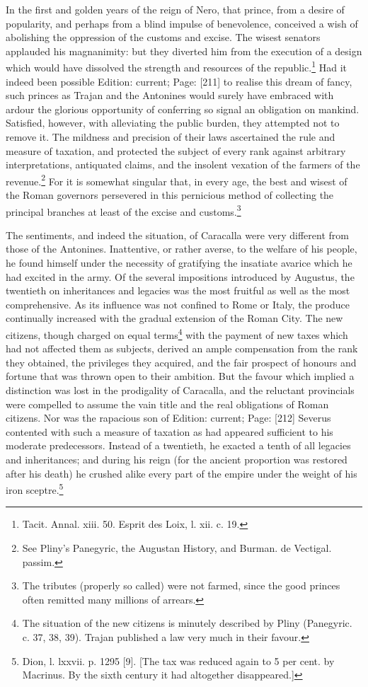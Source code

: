 In the first and golden years of the reign of Nero, that prince, from a desire of popularity, and perhaps from a blind impulse of benevolence, conceived a wish of abolishing the oppression of the customs and excise. The wisest senators applauded his magnanimity: but they diverted him from the execution of a design which would have dissolved the strength and resources of the republic.\footnote{Tacit. Annal. xiii. 50. Esprit des Loix, l. xii. c. 19.} Had it indeed been possible Edition: current; Page: [211] to realise this dream of fancy, such princes as Trajan and the Antonines would surely have embraced with ardour the glorious opportunity of conferring so signal an obligation on mankind. Satisfied, however, with alleviating the public burden, they attempted not to remove it. The mildness and precision of their laws ascertained the rule and measure of taxation, and protected the subject of every rank against arbitrary interpretations, antiquated claims, and the insolent vexation of the farmers of the revenue.\footnote{See Pliny\texthebrew{}’s Panegyric, the Augustan History, and Burman. de Vectigal. passim.} For it is somewhat singular that, in every age, the best and wisest of the Roman governors persevered in this pernicious method of collecting the principal branches at least of the excise and customs.\footnote{The tributes (properly so called) were not farmed, since the good princes often remitted many millions of arrears.}

The sentiments, and indeed the situation, of Caracalla were very different from those of the Antonines. Inattentive, or rather averse, to the welfare of his people, he found himself under the necessity of gratifying the insatiate avarice which he had excited in the army. Of the several impositions introduced by Augustus, the twentieth on inheritances and legacies was the most fruitful as well as the most comprehensive. As its influence was not confined to Rome or Italy, the produce continually increased with the gradual extension of the Roman City. The new citizens, though charged on equal terms\footnote{The situation of the new citizens is minutely described by Pliny (Panegyric. c. 37, 38, 39). Trajan published a law very much in their favour.} with the payment of new taxes which had not affected them as subjects, derived an ample compensation from the rank they obtained, the privileges they acquired, and the fair prospect of honours and fortune that was thrown open to their ambition. But the favour which implied a distinction was lost in the prodigality of Caracalla, and the reluctant provincials were compelled to assume the vain title and the real obligations of Roman citizens. Nor was the rapacious son of Edition: current; Page: [212] Severus contented with such a measure of taxation as had appeared sufficient to his moderate predecessors. Instead of a twentieth, he exacted a tenth of all legacies and inheritances; and during his reign (for the ancient proportion was restored after his death) he crushed alike every part of the empire under the weight of his iron sceptre.\footnote{Dion, l. lxxvii. p. 1295 [9]. [The tax was reduced again to 5 per cent. by Macrinus. By the sixth century it had altogether disappeared.]}

